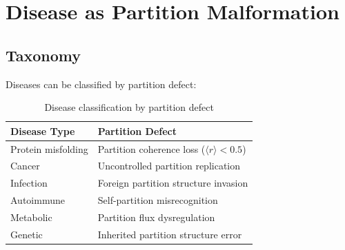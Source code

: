 \documentclass[twocolumn,10pt,a4paper]{article}
\theoremstyle{definition}
\theoremstyle{remark}
\newcommand{\Order}{\langle r \rangle}
\begin{document}
\section{Disease as Partition Malformation}
\label{sec:pathology}

\subsection{Taxonomy}

Diseases can be classified by partition defect:

\begin{table}[h]
\centering
\caption{Disease classification by partition defect}
\label{tab:disease}
\begin{tabular}{ll}
\toprule
Disease Type & Partition Defect \\
\midrule
Protein misfolding & Partition coherence loss ($\Order < 0.5$) \\
Cancer & Uncontrolled partition replication \\
Infection & Foreign partition structure invasion \\
Autoimmune & Self-partition misrecognition \\
Metabolic & Partition flux dysregulation \\
Genetic & Inherited partition structure error \\
\bottomrule
\end{tabular}
\end{table}
\end{document}
